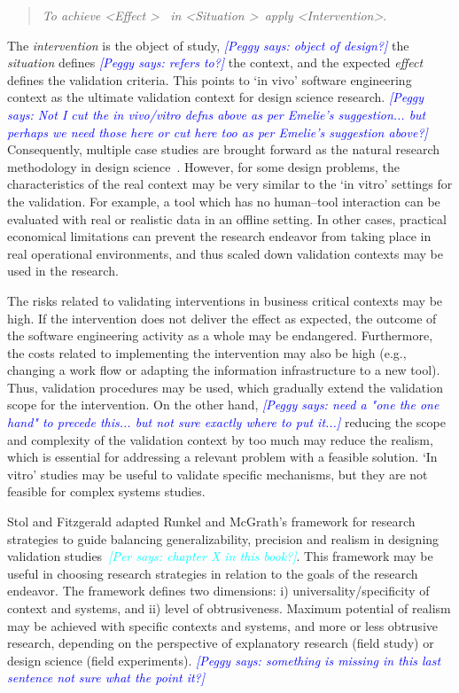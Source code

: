 \documentclass[graybox]{svmult}
\newcommand{\peggy}[1]{\textcolor{blue}{{\it [Peggy says: #1]}}}
\newcommand{\per}[1]{\textcolor{cyan}{{\it [Per says: #1]}}}
\newcommand{\peggy}[1]{}
\newcommand{\per}[1]{}
\begin{document}
\begin{quote}{\emph{To achieve \textless Effect \textgreater ~ in \textless Situation \textgreater~apply \textless Intervention\textgreater}.} 
\end{quote} 
The \emph{intervention} is the object of study,
\peggy{object of design?}
 the \emph{situation} defines \peggy{refers to?} the context, and the expected \emph{effect} defines the validation criteria. This points to `in vivo' software engineering context as the ultimate validation context for design science research. 
 \peggy{Not I cut the in vivo/vitro defns above as per Emelie's suggestion... but perhaps we need those here or cut here too as per Emelie's suggestion above?}
 Consequently, multiple case studies are brought forward as the natural research methodology in design science~\cite{van_aken_management_2004}. However, for some design problems, the characteristics of the real context may be very similar to the `in vitro' settings for the validation. For example, a tool which has no human--tool interaction can be evaluated with real or realistic data in an offline setting. In other cases, practical economical limitations can prevent the research endeavor from taking place in real operational environments, and thus scaled down validation contexts may be used in the research. 


The risks related to validating interventions in business critical contexts may be high. If the intervention does not deliver the effect as expected, the outcome of the software engineering activity as a whole may be endangered. Furthermore, the costs related to implementing the intervention may also be high (e.g., changing a work flow or adapting the information infrastructure to a new tool). Thus, validation procedures may be used, which gradually extend the validation scope for the intervention.
On the other hand, \peggy{need a "one the one hand" to precede this... but not sure exactly where to put it...} reducing the scope and complexity of the validation context by too much may reduce the realism, which is essential for addressing a relevant problem with a feasible solution. `In vitro' studies may be useful to validate specific mechanisms, but they are not feasible for complex systems studies.  

Stol and Fitzgerald adapted Runkel and McGrath's framework for research strategies to guide balancing generalizability, precision and realism in designing validation studies~\cite{StolABC18}\per{chapter X in this book?}. This framework may be useful in choosing research strategies in relation to the goals of the research endeavor. The framework defines two dimensions: i) universality/specificity of context and systems, and ii) level of obtrusiveness. Maximum potential of realism may be achieved with specific contexts and systems, and more or less obtrusive research, depending on the perspective of explanatory research (field study) or design science (field experiments).   \peggy{something is missing in this last sentence not sure what the point it?}
\end{document}

